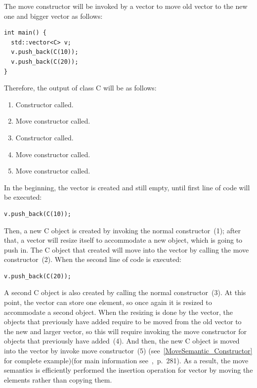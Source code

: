 \documentclass[11pt]{report}
\begin{document}
The move constructor will be invoked by a vector to move old vector to the new one and bigger vector as follows:
\begin{lstlisting}
int main() {
  std::vector<C> v;
  v.push_back(C(10));
  v.push_back(C(20));
}
\end{lstlisting}

Therefore, the output of class C will be as follows:
\begin{enumerate}
\item Constructor called.
\item Move constructor called.
\item Constructor called.
\item Move constructor called.
\item Move constructor called.
\end{enumerate}

In the beginning, the vector is created and still empty, until first line of code will be executed:
\begin{lstlisting}
v.push_back(C(10));
\end{lstlisting}

Then, a new C object is created by invoking the normal constructor~(1); after that, a vector will resize itself to accommodate a new object, which is going to push in. The C object that created will move into the vector by calling the move constructor~(2). When the second line of code is executed:
\begin{lstlisting}
v.push_back(C(20));
\end{lstlisting}

A second C object is also created by calling the normal constructor~(3). At this point, the vector can store one element, so once again it is resized to accommodate a second object. When the resizing is done by the vector, the objects that previously have added require to be moved from the old vector to the new and larger vector, so this will require invoking the move constructor for objects that previously have added~(4). And then, the new C object is moved into the vector by invoke move constructor~(5) (see~\ref{MoveSemantic_Constructor} for complete example)(for main information see~\cite{Gregorie:professionalcpp},~p.~281). As a result, the move semantics is efficiently performed the insertion operation for vector by moving the elements rather than copying them.
\end{document}
